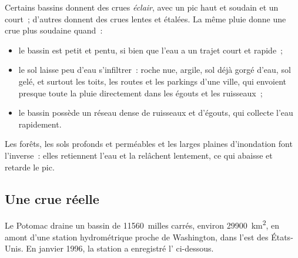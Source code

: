 Certains bassins donnent des crues \emph{éclair}, avec un pic haut et
soudain et un  court~; d'autres donnent des crues lentes et
étalées. La même pluie donne une crue plus soudaine quand~:
\begin{itemize}
  \item le bassin est petit et pentu, si bien que l'eau a un trajet court et
        rapide~;
  \item le sol laisse peu d'eau s'infiltrer~: roche nue, argile, sol déjà
        gorgé d'eau, sol gelé, et surtout les toits, les routes et les
        parkings d'une ville, qui envoient presque toute la pluie
        directement dans les égouts et les ruisseaux~;
  \item le bassin possède un réseau dense de ruisseaux et d'égouts, qui
        collecte l'eau rapidement.
\end{itemize}
Les forêts, les sols profonds et perméables et les larges plaines
d'inondation font l'inverse~: elles retiennent l'eau et la relâchent
lentement, ce qui abaisse et retarde le pic.

\subsection*{Une crue réelle}

Le Potomac draine un bassin de \num{11560}~milles carrés, environ
\qty{29900}{km^2}, en amont d'une station hydrométrique proche de
Washington, dans l'est des États-Unis. En janvier 1996, la station a
enregistré l' ci-dessous.

